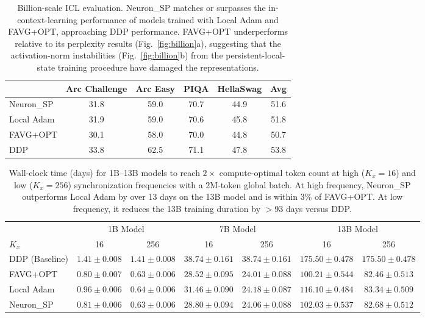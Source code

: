 \documentclass{article}
\begin{document}
\begin{table}[t]
\centering
\caption{Billion-scale ICL evaluation. Neuron\_SP matches or surpasses
the in-context-learning performance of models trained with Local Adam
and FAVG+OPT, approaching DDP performance. FAVG+OPT underperforms
relative to its perplexity results (Fig.~\ref{fig:billion}a), suggesting
that the activation-norm instabilities (Fig.~\ref{fig:billion}b) from
the persistent-local-state training procedure have damaged the
representations.}
\label{tab:icl}
\begin{tabular}{lcccc|c}
\toprule
& Arc Challenge & Arc Easy & PIQA & HellaSwag & Avg \\
\midrule
Neuron\_SP    & 31.8 & 59.0 & 70.7 & 44.9 & 51.6 \\
Local Adam   & 31.9 & 59.0 & 70.6 & 45.8 & 51.8 \\
FAVG+OPT     & 30.1 & 58.0 & 70.0 & 44.8 & 50.7 \\
\midrule
DDP          & 33.8 & 62.5 & 71.1 & 47.8 & 53.8 \\
\bottomrule
\end{tabular}
\end{table}

\begin{table}[t]
\centering
\caption{Wall-clock time (days) for 1B--13B models to reach $2\times$
compute-optimal token count at high ($K_x = 16$) and low ($K_x = 256$)
synchronization frequencies with a 2M-token global batch. At high
frequency, Neuron\_SP outperforms Local Adam by over 13 days on the 13B
model and is within 3\% of FAVG+OPT. At low frequency, it reduces the
13B training duration by $>$93 days versus DDP.}
\label{tab:wallclock}
\begin{tabular}{l|cc|cc|cc}
\toprule
& \multicolumn{2}{c|}{1B Model} & \multicolumn{2}{c|}{7B Model}
& \multicolumn{2}{c}{13B Model} \\
$K_x$ & 16 & 256 & 16 & 256 & 16 & 256 \\
\midrule
DDP (Baseline) & $1.41 \pm 0.008$ & $1.41 \pm 0.008$
& $38.74 \pm 0.161$ & $38.74 \pm 0.161$
& $175.50 \pm 0.478$ & $175.50 \pm 0.478$ \\
\midrule
FAVG+OPT & $0.80 \pm 0.007$ & $0.63 \pm 0.006$
& $28.52 \pm 0.095$ & $24.01 \pm 0.088$
& $100.21 \pm 0.544$ & $82.46 \pm 0.513$ \\
Local Adam & $0.96 \pm 0.006$ & $0.64 \pm 0.006$
& $31.46 \pm 0.090$ & $24.18 \pm 0.087$
& $116.10 \pm 0.484$ & $83.34 \pm 0.509$ \\
Neuron\_SP & $0.81 \pm 0.006$ & $0.63 \pm 0.006$
& $28.80 \pm 0.094$ & $24.06 \pm 0.088$
& $102.03 \pm 0.537$ & $82.68 \pm 0.512$ \\
\bottomrule
\end{tabular}
\end{table}
\end{document}
